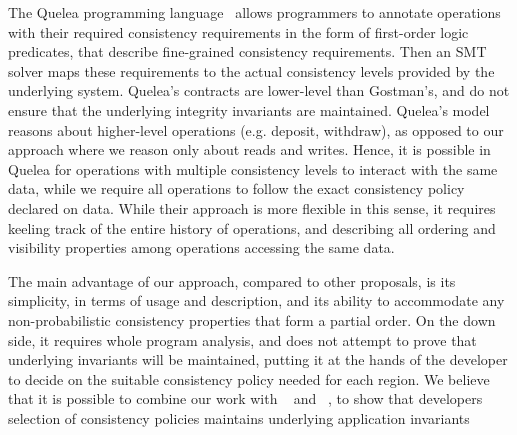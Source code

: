 \documentclass[preprint,numbers]{sigplanconf}
\begin{document}
The Quelea programming language~\cite{sivaramakrishnan2015declarative} allows
programmers to annotate operations with their required consistency requirements
in the form of first-order logic predicates, that describe fine-grained consistency
requirements. Then an SMT solver maps these requirements to the actual
consistency levels provided by the underlying system. Quelea's contracts are
lower-level than Gostman's, and do not ensure that the underlying integrity
invariants are maintained. Quelea's model reasons about higher-level
operations (e.g. deposit, withdraw), as opposed to our approach where we reason 
only about reads and writes. Hence, it is possible in Quelea for operations with
multiple consistency levels to interact with the same data, while we require all 
operations to follow the exact consistency policy declared on data. While their 
approach is more flexible in this sense, it requires keeling track of the entire
history of operations, and describing all ordering and visibility properties among 
operations accessing the same data.




The main advantage of our approach, compared to other proposals, is its simplicity,
in terms of usage and description, and its ability to accommodate any
non-probabilistic consistency properties that form a partial order. On the down side, 
it requires whole program analysis, and does not attempt to prove that underlying 
invariants will be maintained, putting it at the hands of the developer to decide 
on the suitable consistency policy needed for each region. We believe that it is 
possible to combine our work with ~\cite{gotsman2016cause}
and ~\cite{balegas2015putting}, to show that developers selection of consistency
policies maintains underlying application invariants
\end{document}
